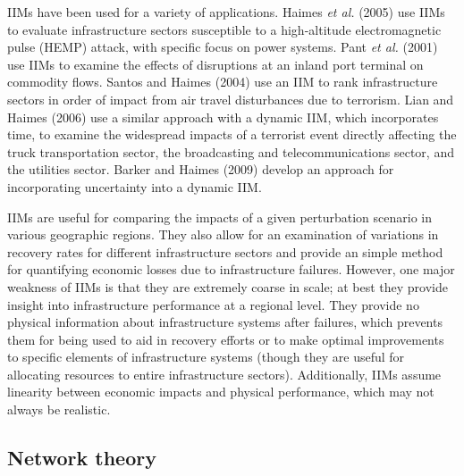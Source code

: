 IIMs have been used for a variety of applications.  Haimes \emph{et al.} (2005)\cite{Haimes2005} use IIMs to evaluate infrastructure sectors susceptible to a high-altitude electromagnetic pulse (HEMP) attack, with specific focus on power systems.  Pant \emph{et al.} (2001) \cite{Pant2011} use IIMs to examine the effects of disruptions at an inland port terminal on commodity flows.  Santos and Haimes (2004) \cite{Santos2004} use an IIM to rank infrastructure sectors in order of impact from air travel disturbances due to terrorism. Lian and Haimes (2006)\cite{Lian2006} use a similar approach with a dynamic IIM, which incorporates time, to examine the widespread impacts of a terrorist event directly affecting the truck transportation sector, the broadcasting and telecommunications sector, and the utilities sector.  Barker and Haimes (2009)\cite{Barker2009} develop an approach for incorporating uncertainty into a dynamic IIM.

IIMs are useful for comparing the impacts of a given perturbation scenario in various geographic regions.  They also allow for an examination of variations in recovery rates for different infrastructure sectors and provide an simple method for quantifying economic losses due to infrastructure failures.  However, one major weakness of IIMs is that they are extremely coarse in scale; at best they provide insight into infrastructure performance at a regional level.  They provide no physical information about infrastructure systems after failures, which prevents them for being used to aid in recovery efforts or to make optimal improvements to specific elements of infrastructure systems (though they are useful for allocating resources to entire infrastructure sectors).  Additionally, IIMs assume linearity between economic impacts and physical performance, which may not always be realistic.


\subsection{Network theory}
\label{sec:ch1:interdependentreliability:networks}

